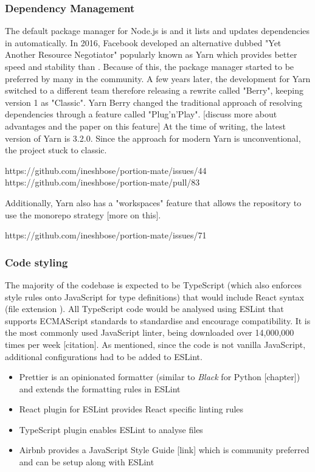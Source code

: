 \documentclass{l4proj}
\begin{document}
\subsubsection{Dependency Management}

The default package manager for Node.js is  and it lists and updates dependencies in  automatically. In 2016, Facebook developed an alternative dubbed "Yet Another Resource Negotiator" popularly known as Yarn which provides better speed and stability than . Because of this, the package manager started to be preferred by many in the community. A few years later, the development for Yarn switched to a different team therefore releasing a rewrite called "Berry", keeping version 1 as "Classic". Yarn Berry changed the traditional approach of resolving dependencies through a feature called "Plug'n'Play". [discuss more about advantages and the paper on this feature] At the time of writing, the latest version of Yarn is 3.2.0. Since the approach for modern Yarn is unconventional, the project stuck to classic.

https://github.com/ineshbose/portion-mate/issues/44
https://github.com/ineshbose/portion-mate/pull/83

Additionally, Yarn also has a "workspaces" feature that allows the repository to use the monorepo strategy [more on this].

https://github.com/ineshbose/portion-mate/issues/71

\subsubsection{Code styling}

The majority of the codebase is expected to be TypeScript (which also enforces style rules onto JavaScript for type definitions) that would include React syntax (file extension ). All TypeScript code would be analysed using ESLint that supports ECMAScript standards to standardise and encourage compatibility. It is the most commonly used JavaScript linter, being downloaded over 14,000,000 times per week [citation]. As mentioned, since the code is not vanilla JavaScript, additional configurations had to be added to ESLint.

\begin{itemize}
    \item Prettier is an opinionated formatter (similar to \textit{Black} for Python [chapter]) and extends the formatting rules in ESLint
    \item React plugin for ESLint provides React specific linting rules
    \item TypeScript plugin enables ESLint to analyse  files
    \item Airbnb provides a JavaScript Style Guide [link] which is community preferred and can be setup along with ESLint
\end{itemize}
\end{document}
